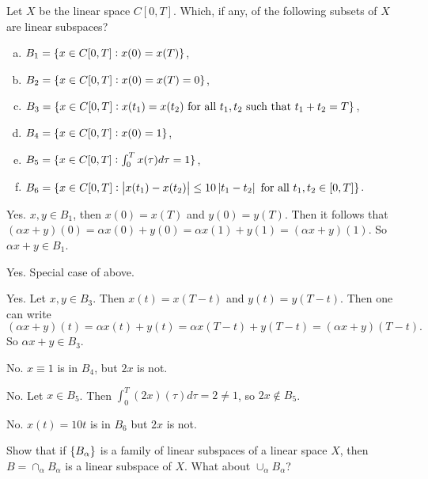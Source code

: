 \begin{problem}
	Let $ X $ be the linear space $ C[0,T] $. Which, if any, of the following subsets of $ X $ are linear subspaces?
	\begin{enumerate}[(a)]
		\item $ B_1 = \{x\in C[0,T]: x(0) = x(T)\} $,
		\item $ B_2 = \{x\in C[0,T]: x(0) = x(T) = 0\} $,
		\item $ B_3 = \{x\in C[0,T]: x(t_1)=x(t_2) \text{ for all $ t_1,t_2 $ such that $ t_1+t_2 = T $}\} $,
		\item $ B_4 = \{x\in C[0,T]: x(0) = 1\} $,
		\item $ B_5 = \{x\in C[0,T]: \int_{0}^{T} x(\tau) d\tau = 1 \} $,
		\item $ B_6 = \{x\in C[0,T]: \left|x(t_1)-x(t_2)\right|\leq 10\left|t_1-t_2\right| \text{ for all $ t_1,t_2\in [0,T] $}\} $.
	\end{enumerate}
\end{problem}

\begin{solution}
	\item Yes. $ x,y\in B_1 $, then $ x(0) = x(T) $ and $ y(0) = y(T) $. Then it follows that $ (\alpha x+y)(0) = \alpha x(0) + y(0) = \alpha x(1) + y(1) = (\alpha x + y)(1) $. So $ \alpha x + y \in B_1 $.
	
	\item Yes. Special case of above.
	
	\item Yes. Let $ x,y\in B_3 $. Then $ x(t) = x(T-t) $ and $ y(t) = y(T-t) $. Then one can write
	\[ (\alpha x + y)(t) = \alpha x(t) + y(t) = \alpha x(T-t) + y(T-t) = (\alpha x+y)(T-t). \]
	So $ \alpha x + y \in B_3 $.
	
	\item No. $ x\equiv 1 $ is in $ B_4 $, but $ 2x $ is not.
	
	\item No. Let $ x\in B_5 $. Then $ \int_{0}^{T} (2x)(\tau) d\tau = 2 \neq 1$, so $ 2x \notin B_5 $.
	
	\item No.  $ x(t) = 10t $ is in $ B_6 $ but $ 2x $ is not.
\end{solution}


\begin{problem}
	\label{prob:intersectionOfSubspaces}
	Show that if $ \{B_\alpha\} $ is a family of linear subspaces of a linear space $ X $, then $ B = \cap_\alpha B_\alpha $ is a linear subspace of $ X $. What about $ \cup_\alpha B_\alpha $?
\end{problem}

